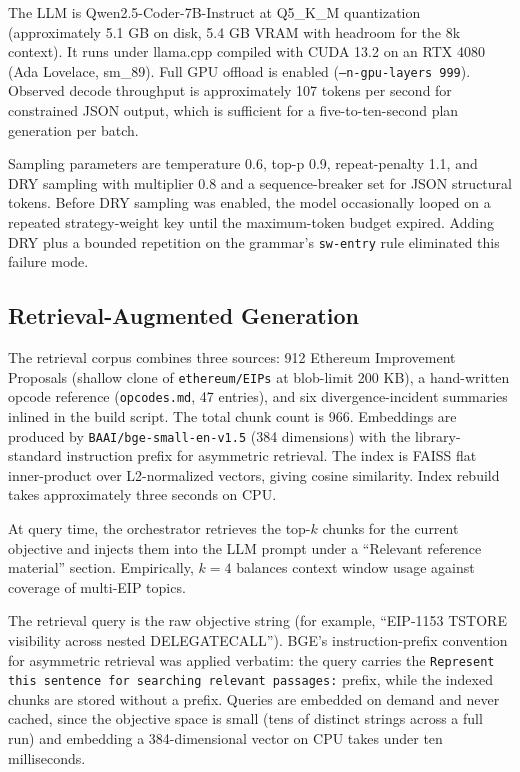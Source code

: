 \documentclass[conference]{IEEEtran}
\begin{document}
The LLM is Qwen2.5-Coder-7B-Instruct \cite{qwencoder} at Q5\_K\_M quantization (approximately 5.1 GB on disk, 5.4 GB VRAM with headroom for the 8k context). It runs under llama.cpp compiled with CUDA 13.2 on an RTX 4080 (Ada Lovelace, sm\_89). Full GPU offload is enabled (\texttt{--n-gpu-layers 999}). Observed decode throughput is approximately 107 tokens per second for constrained JSON output, which is sufficient for a five-to-ten-second plan generation per batch.

Sampling parameters are temperature 0.6, top-p 0.9, repeat-penalty 1.1, and DRY sampling with multiplier 0.8 and a sequence-breaker set for JSON structural tokens. Before DRY sampling was enabled, the model occasionally looped on a repeated strategy-weight key until the maximum-token budget expired. Adding DRY plus a bounded repetition on the grammar's \texttt{sw-entry} rule eliminated this failure mode.

\subsection{Retrieval-Augmented Generation}

The retrieval corpus combines three sources: 912 Ethereum Improvement Proposals (shallow clone of \texttt{ethereum/EIPs} at blob-limit 200 KB), a hand-written opcode reference (\texttt{opcodes.md}, 47 entries), and six divergence-incident summaries inlined in the build script. The total chunk count is 966. Embeddings are produced by \texttt{BAAI/bge-small-en-v1.5} (384 dimensions) with the library-standard instruction prefix for asymmetric retrieval. The index is FAISS flat inner-product over L2-normalized vectors, giving cosine similarity. Index rebuild takes approximately three seconds on CPU.

At query time, the orchestrator retrieves the top-$k$ chunks for the current objective and injects them into the LLM prompt under a ``Relevant reference material'' section. Empirically, $k=4$ balances context window usage against coverage of multi-EIP topics.

The retrieval query is the raw objective string (for example, ``EIP-1153 TSTORE visibility across nested DELEGATECALL''). BGE's instruction-prefix convention for asymmetric retrieval was applied verbatim: the query carries the \texttt{Represent this sentence for searching relevant passages:} prefix, while the indexed chunks are stored without a prefix. Queries are embedded on demand and never cached, since the objective space is small (tens of distinct strings across a full run) and embedding a 384-dimensional vector on CPU takes under ten milliseconds.
\end{document}
